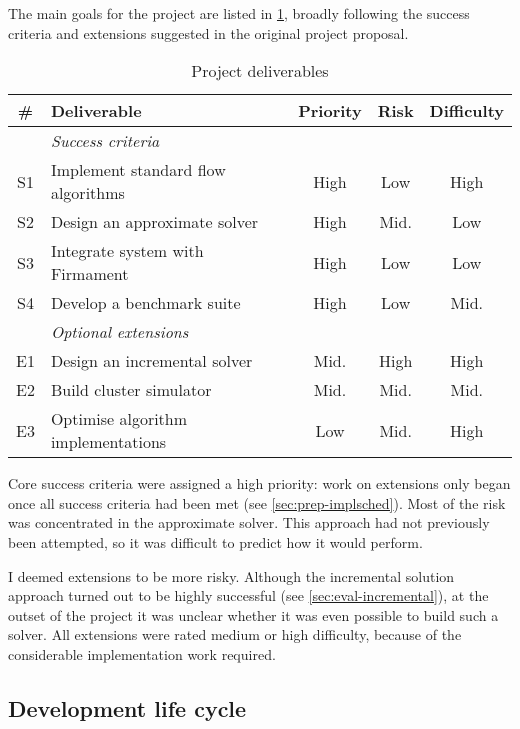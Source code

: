 
The main goals for the project are listed in \cref{table:prep-project-requirements}, broadly following the success criteria and extensions suggested in the original project proposal.

\begin{table}
    \centering
    \begin{tabular}{clccc}
        \textbf{\#} & \textbf{Deliverable} & \textbf{Priority} & \textbf{Risk} & \textbf{Difficulty}
        \tabularnewline
        \hline
        & \textit{Success criteria} \tabularnewline
        S1 & Implement standard flow algorithms & High & Low & High \tabularnewline
        S2 & Design an approximate solver & High & Mid. & Low \tabularnewline
        S3 & Integrate system with Firmament & High & Low & Low \tabularnewline
        S4 & Develop a benchmark suite  & High & Low & Mid. \tabularnewline
        \hline
        & \textit{Optional extensions} \tabularnewline
        E1 & Design an incremental solver & Mid. & High & High \tabularnewline
        E2 & Build cluster simulator & Mid. & Mid. & Mid. \tabularnewline
        E3 & Optimise algorithm implementations & Low & Mid. & High \tabularnewline
        \hline
    \end{tabular}
    \caption{Project deliverables}
    \label{table:prep-project-requirements}
\end{table}

Core success criteria were assigned a high priority: work on extensions only began once all success criteria had been met (see \cref{sec:prep-implsched}). Most of the risk was concentrated in the approximate solver. This approach had not previously been attempted, so it was difficult to predict how it would perform.

I deemed extensions to be more risky. Although the incremental solution approach turned out to be highly successful (see \cref{sec:eval-incremental}), at the outset of the project it was unclear whether it was even possible to build such a solver. All extensions were rated medium or high difficulty, because of the considerable implementation work required.

\subsection{Development life cycle}
\label{sec:prep-management-model}

